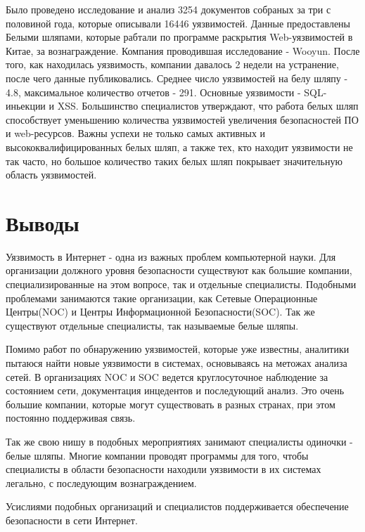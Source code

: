 \documentclass[11pt, a4paper]{article}		%
\begin{document}
Было проведено исследование и анализ 3254 документов собраных за три с половиной года, которые описывали 16446 уязвимостей. Данные предоставлены Белыми шляпами, которые рабтали по программе раскрытия Web-уязвимостей в Китае, за вознаграждение. Компания проводившая исследование - Wooyun. После того, как находилась уязвимость, компании давалось 2 недели на устранение, после чего данные публиковались. Среднее число уязвимостей на белу шляпу - 4.8, максимальное количество отчетов - 291. Основные уязвимости - SQL-иньекции и XSS. Большинство специалистов утверждают, что работа белых шляп способствует уменьшению количества уязвимостей увеличения безопасностей ПО и web-ресурсов. Важны успехи не только самых активных и высококвалифицированных белых шляп, а также тех, кто находит уязвимости не так часто, но большое количество таких белых шляп покрывает значительную область уязвимостей.



\section{Выводы}

Уязвимость в Интернет - одна из важных проблем компьютерной науки. Для организации должного уровня безопасности существуют как большие компании, специализированные на этом вопросе, так и отдельные специалисты. Подобными проблемами занимаются такие организации, как Сетевые Операционные Центры(NOC) и Центры Информационной Безопасности(SOC). Так же существуют отдельные специалисты, так называемые белые шляпы.

Помимо работ по обнаружению уязвимостей, которые уже известны, аналитики пытаюся найти новые уязвимости в системах, основываясь на метожах анализа сетей. В организациях NOC и SOC ведется круглосуточное наблюдение за состоянием сети, документация инцедентов и последующий анализ. Это очень большие компании, которые могут существовать в разных странах, при этом постоянно поддерживая связь.

Так же свою нишу в подобных мероприятиях занимают специалисты одиночки - белые шляпы. Многие компании проводят программы для того, чтобы специалисты в области безопасности находили уязвимости в их системах легально, с последующим вознаграждением. 

Усислиями подобных организаций и специалистов поддерживается обеспечение безопасности в сети Интернет.
\end{document}
